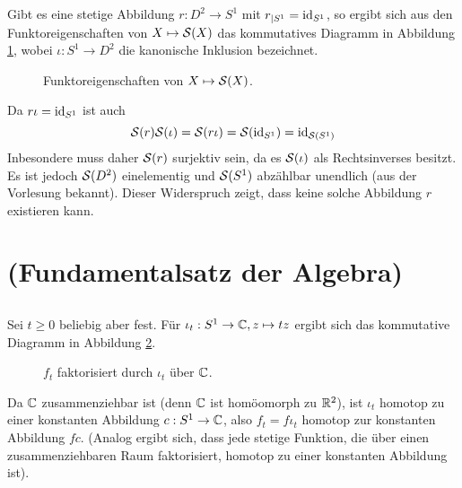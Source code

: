 \documentclass[a4paper,10pt]{article}
\begin{document}
Gibt es eine stetige Abbildung $r : D^2 \to S^1$ mit $r_{|S^1} = \operatorname{id}_{S^1}$, so ergibt sich aus den Funktoreigenschaften von $X \mapsto \mathcal{S}(X)$ das kommutatives Diagramm in Abbildung \ref{fig: SX Funktor}, wobei $\iota : S^1 \to D^2$ die kanonische Inklusion bezeichnet.
\begin{figure}\centering
 \caption{Funktoreigenschaften von $X \mapsto \mathcal{S}(X)$.}
 \label{fig: SX Funktor}
\end{figure}

Da $r \iota = \operatorname{id}_{S^1}$ ist auch
\[
 \mathcal{S}(r) \mathcal{S}(\iota) = \mathcal{S}(r \iota) = \mathcal{S}(\operatorname{id}_{S^1}) = \operatorname{id}_{\mathcal{S}\left(S^1\right)}
\]
Inbesondere muss daher $\mathcal{S}(r)$ surjektiv sein, da es $\mathcal{S}(\iota)$ als Rechtsinverses besitzt. Es ist jedoch $\mathcal{S}(D^2)$ einelementig und $\mathcal{S}(S^1)$ abzählbar unendlich (aus der Vorlesung bekannt). Dieser Widerspruch zeigt, dass keine solche Abbildung $r$ existieren kann.





\section{(Fundamentalsatz der Algebra)}


\subsection{}
Sei $t \geq 0$ beliebig aber fest. Für $\iota_t : S^1 \to \mathbb{C}, z \mapsto tz$ ergibt sich das kommutative Diagramm in Abbildung \ref{fig: f_t faktorisiert}.
\begin{figure}\centering
 \caption{$f_t$ faktorisiert durch $\iota_t$ über $\mathbb{C}$.}
 \label{fig: f_t faktorisiert}
\end{figure}
Da $\mathbb{C}$ zusammenziehbar ist (denn $\mathbb{C}$ ist homöomorph zu $\mathbb{R}^2$), ist $\iota_t$ homotop zu einer konstanten Abbildung $c : S^1 \to \mathbb{C}$, also $f_t = f \iota_t$ homotop zur konstanten Abbildung $f c$. (Analog ergibt sich, dass jede stetige Funktion, die über einen zusammenziehbaren Raum faktorisiert, homotop zu einer konstanten Abbildung ist).
\end{document}

